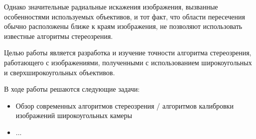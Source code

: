 Однако значительные радиальные искажения изображения, вызванные особенностями используемых объективов, и тот факт, что области пересечения 
обычно расположены ближе к краям изображения, не позволяют использовать известные алгоритмы стереозрения. %

Целью работы является разработка и изучение точности алгоритма стереозрения, работающего с изображениями, полученными с использованием
широкоугольных и сверхширокоугольных объективов. 

В ходе работы решаются следующие задачи:
\begin{itemize}
    \item Обзор современных алгоритмов стереозрения / алгоритмов калибровки изображений широкоугольных камеры
    \item ...
\end{itemize}
